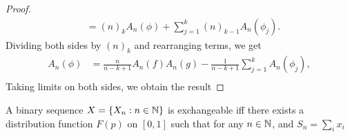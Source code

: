 \documentclass[a4paper,english,10pt]{article}
\begin{document}
\begin{proof}
\begin{align*}
&= (n)_kA_n(\phi) + \sum_{j=1}^k(n)_{k-1}A_n(\phi_j).
\end{align*}
Dividing both sides by $(n)_k$ and rearranging terms, we get
\begin{align*}
A_n(\phi)& = \frac{n}{n-k+1}A_n(f)A_n(g) - \frac{1}{n-k+1}\sum_{j=1}^kA_n(\phi_j),\\
\end{align*}
Taking limits on both sides, we obtain the result
\end{proof}
\begin{cor}[De Finetti 1931]
A binary sequence $X = \{X_n: n \in \mathbb{N}\}$ is exchangeable iff there exists a distribution function $F(p)$ on $[0,1]$ such that for any $n \in \mathbb{N}$, and $S_n=\sum_i x_i$
\end{cor}
\end{document}
